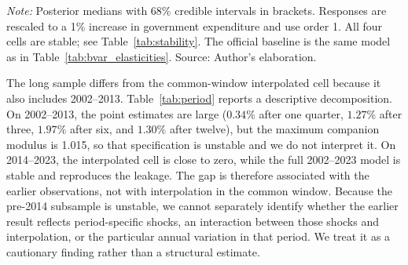 \documentclass[11pt,a4paper]{article}
\begin{document}
\begin{table}[htbp]
\centering
\small
\caption{Common-window 2x2 hybrid design, 2014--2023 (percent)}
\label{tab:hybrid2x2}
\par\vspace{0.3em}
\begin{minipage}{0.95\textwidth}
\footnotesize\textit{Note:} Posterior medians with 68\% credible intervals in brackets. Responses are rescaled to a 1\% increase in government expenditure and use order 1. All four cells are stable; see Table~\ref{tab:stability}. The official baseline is the same model as in Table~\ref{tab:bvar_elasticities}. Source: Author's elaboration.
\end{minipage}
\end{table}

The long sample differs from the common-window interpolated cell because it also includes 2002--2013. Table~\ref{tab:period} reports a descriptive decomposition. On 2002--2013, the point estimates are large ($0.34\%$ after one quarter, $1.27\%$ after three, $1.97\%$ after six, and $1.30\%$ after twelve), but the maximum companion modulus is 1.015, so that specification is unstable and we do not interpret it. On 2014--2023, the interpolated cell is close to zero, while the full 2002--2023 model is stable and reproduces the leakage. The gap is therefore associated with the earlier observations, not with interpolation in the common window. Because the pre-2014 subsample is unstable, we cannot separately identify whether the earlier result reflects period-specific shocks, an interaction between those shocks and interpolation, or the particular annual variation in that period. We treat it as a cautionary finding rather than a structural estimate.
\end{document}
